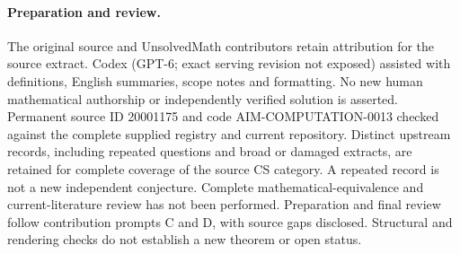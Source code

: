 \documentclass[11pt]{article}
\begin{document}
\paragraph{Preparation and review.}
The original source and UnsolvedMath contributors retain attribution for the source extract. Codex (GPT-6; exact serving revision not exposed) assisted with definitions, English summaries, scope notes and formatting. No new human mathematical authorship or independently verified solution is asserted. Permanent source ID 20001175 and code AIM-COMPUTATION-0013 checked against the complete supplied registry and current repository. Distinct upstream records, including repeated questions and broad or damaged extracts, are retained for complete coverage of the source CS category. A repeated record is not a new independent conjecture. Complete mathematical-equivalence and current-literature review has not been performed. Preparation and final review follow contribution prompts C and D, with source gaps disclosed. Structural and rendering checks do not establish a new theorem or open status.
\label{end:20001175}
\end{document}
